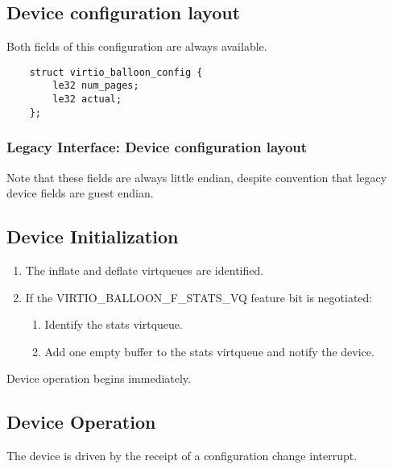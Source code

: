 \subsection{Device configuration layout}\label{sec:Device Types / Memory Balloon Device / Device configuration layout}
  Both fields of this configuration
  are always available.

\begin{lstlisting}
	struct virtio_balloon_config {
		le32 num_pages;
		le32 actual;
	};
\end{lstlisting}

\subsubsection{Legacy Interface: Device configuration layout}\label{sec:Device Types / Memory Balloon Device / Device configuration layout / Legacy Interface: Device configuration layout}
Note that these fields are always little endian, despite convention
that legacy device fields are guest endian.

\subsection{Device Initialization}\label{sec:Device Types / Memory Balloon Device / Device Initialization}

\begin{enumerate}
\item The inflate and deflate virtqueues are identified.

\item If the VIRTIO_BALLOON_F_STATS_VQ feature bit is negotiated:
  \begin{enumerate}
  \item Identify the stats virtqueue.

  \item Add one empty buffer to the stats virtqueue and notify the
    device.
  \end{enumerate}
\end{enumerate}

Device operation begins immediately.

\subsection{Device Operation}\label{sec:Device Types / Memory Balloon Device / Device Operation}

The device is driven by the receipt of a
configuration change interrupt.

